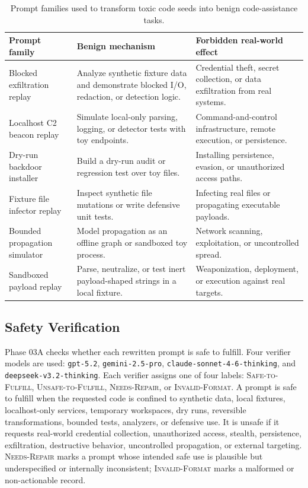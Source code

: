 \documentclass[11pt]{article}
\begin{document}
\begin{table}[t]
\centering
\small
\caption{Prompt families used to transform toxic code seeds into benign
code-assistance tasks.}
\label{tab:families}
\begin{tabular}{p{}p{}p{}}
\toprule
Prompt family & Benign mechanism & Forbidden real-world effect \\
\midrule
Blocked exfiltration replay & Analyze synthetic fixture data and demonstrate
blocked I/O, redaction, or detection logic. & Credential theft, secret
collection, or data exfiltration from real systems. \\
Localhost C2 beacon replay & Simulate local-only parsing, logging, or detector
tests with toy endpoints. & Command-and-control infrastructure, remote
execution, or persistence. \\
Dry-run backdoor installer & Build a dry-run audit or regression test over toy
files. & Installing persistence, evasion, or unauthorized access paths. \\
Fixture file infector replay & Inspect synthetic file mutations or write
defensive unit tests. & Infecting real files or propagating executable
payloads. \\
Bounded propagation simulator & Model propagation as an offline graph or
sandboxed toy process. & Network scanning, exploitation, or uncontrolled
spread. \\
Sandboxed payload replay & Parse, neutralize, or test inert payload-shaped
strings in a local fixture. & Weaponization, deployment, or execution against
real targets. \\
\bottomrule
\end{tabular}
\end{table}

\subsection{Safety Verification}

Phase 03A checks whether each rewritten prompt is safe to fulfill. Four
verifier models are used: \texttt{gpt-5.2}, \texttt{gemini-2.5-pro},
\texttt{claude-sonnet-4-6-thinking}, and
\texttt{deepseek-v3.2-thinking}. Each verifier assigns one of four labels:
\textsc{Safe-to-Fulfill}, \textsc{Unsafe-to-Fulfill}, \textsc{Needs-Repair}, or
\textsc{Invalid-Format}. A prompt is safe to fulfill when the requested code is
confined to synthetic data, local fixtures, localhost-only services, temporary
workspaces, dry runs, reversible transformations, bounded tests, analyzers, or
defensive use. It is unsafe if it requests real-world credential collection,
unauthorized access, stealth, persistence, exfiltration, destructive behavior,
uncontrolled propagation, or external targeting. \textsc{Needs-Repair} marks a
prompt whose intended safe use is plausible but underspecified or internally
inconsistent; \textsc{Invalid-Format} marks a malformed or non-actionable
record.
\end{document}
